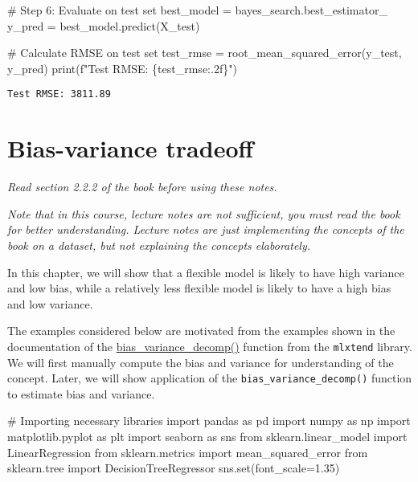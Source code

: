 \documentclass[
  letterpaper,
  DIV=11,
  numbers=noendperiod]{scrreprt}
\newenvironment{Shaded}{\begin{snugshade}}{\end{snugshade}}
\newcommand{\BuiltInTok}[1]{\textcolor[rgb]{0.00,0.23,0.31}{#1}}
\newcommand{\CommentTok}[1]{\textcolor[rgb]{0.37,0.37,0.37}{#1}}
\newcommand{\FloatTok}[1]{\textcolor[rgb]{0.68,0.00,0.00}{#1}}
\newcommand{\ImportTok}[1]{\textcolor[rgb]{0.00,0.46,0.62}{#1}}
\newcommand{\NormalTok}[1]{\textcolor[rgb]{0.00,0.23,0.31}{#1}}
\newcommand{\OperatorTok}[1]{\textcolor[rgb]{0.37,0.37,0.37}{#1}}
\newcommand{\SpecialCharTok}[1]{\textcolor[rgb]{0.37,0.37,0.37}{#1}}
\newcommand{\SpecialStringTok}[1]{\textcolor[rgb]{0.13,0.47,0.30}{#1}}
\begin{document}
\begin{Shaded}
\begin{Highlighting}[]
\CommentTok{\# Step 6: Evaluate on test set}
\NormalTok{best\_model }\OperatorTok{=}\NormalTok{ bayes\_search.best\_estimator\_}
\NormalTok{y\_pred }\OperatorTok{=}\NormalTok{ best\_model.predict(X\_test)}

\CommentTok{\# Calculate RMSE on test set}
\NormalTok{test\_rmse }\OperatorTok{=}\NormalTok{ root\_mean\_squared\_error(y\_test, y\_pred)}
\BuiltInTok{print}\NormalTok{(}\SpecialStringTok{f"Test RMSE: }\SpecialCharTok{\{}\NormalTok{test\_rmse}\SpecialCharTok{:.2f\}}\SpecialStringTok{"}\NormalTok{)}
\end{Highlighting}
\end{Shaded}

\begin{verbatim}
Test RMSE: 3811.89
\end{verbatim}

\chapter{Bias-variance tradeoff}\label{bias-variance-tradeoff}

\emph{Read section 2.2.2 of the book before using these notes.}

\emph{Note that in this course, lecture notes are not sufficient, you
must read the book for better understanding. Lecture notes are just
implementing the concepts of the book on a dataset, but not explaining
the concepts elaborately.}

In this chapter, we will show that a flexible model is likely to have
high variance and low bias, while a relatively less flexible model is
likely to have a high bias and low variance.

The examples considered below are motivated from the examples shown in
the documentation of the
\href{https://rasbt.github.io/mlxtend/user_guide/evaluate/bias_variance_decomp/}{bias\_variance\_decomp()}
function from the \texttt{mlxtend} library. We will first manually
compute the bias and variance for understanding of the concept. Later,
we will show application of the \texttt{bias\_variance\_decomp()}
function to estimate bias and variance.

\begin{Shaded}
\begin{Highlighting}[]
\CommentTok{\# Importing necessary libraries}
\ImportTok{import}\NormalTok{ pandas }\ImportTok{as}\NormalTok{ pd}
\ImportTok{import}\NormalTok{ numpy }\ImportTok{as}\NormalTok{ np}
\ImportTok{import}\NormalTok{ matplotlib.pyplot }\ImportTok{as}\NormalTok{ plt}
\ImportTok{import}\NormalTok{ seaborn }\ImportTok{as}\NormalTok{ sns}
\ImportTok{from}\NormalTok{ sklearn.linear\_model }\ImportTok{import}\NormalTok{ LinearRegression}
\ImportTok{from}\NormalTok{ sklearn.metrics }\ImportTok{import}\NormalTok{ mean\_squared\_error}
\ImportTok{from}\NormalTok{ sklearn.tree }\ImportTok{import}\NormalTok{ DecisionTreeRegressor}
\NormalTok{sns.}\BuiltInTok{set}\NormalTok{(font\_scale}\OperatorTok{=}\FloatTok{1.35}\NormalTok{)}
\end{Highlighting}
\end{Shaded}
\end{document}
